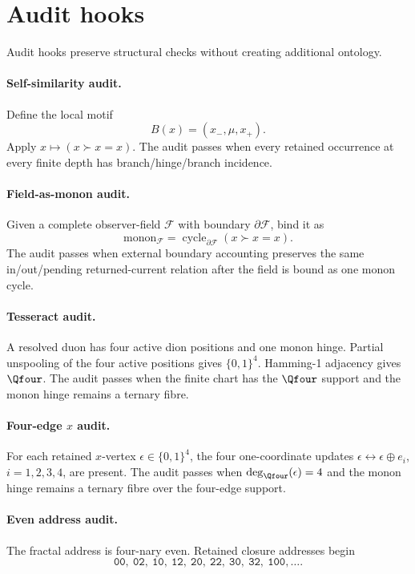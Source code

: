 \section{Audit hooks}\label{sec:audit-hooks}

Audit hooks preserve structural checks without creating additional ontology.

\paragraph{Self-similarity audit.}
Define the local motif
\[
B(x)=(x_-,\mu,x_+).
\]
Apply \(x\mapsto (x\succ x=x)\). The audit passes when every retained occurrence at every finite depth has branch/hinge/branch incidence.

\paragraph{Field-as-monon audit.}
Given a complete observer-field \(\mathcal F\) with boundary \(\partial\mathcal F\), bind it as
\[
\mathrm{monon}_{\mathcal F}=\operatorname{cycle}_{\partial\mathcal F}(x\succ x=x).
\]
The audit passes when external boundary accounting preserves the same in/out/pending returned-current relation after the field is bound as one monon cycle.

\paragraph{Tesseract audit.}
A resolved duon has four active dion positions and one monon hinge. Partial unspooling of the four active positions gives \(\{0,1\}^4\). Hamming-1 adjacency gives \(\Qfour\). The audit passes when the finite chart has the \(\Qfour\) support and the monon hinge remains a ternary fibre.


\paragraph{Four-edge \(x\) audit.}
For each retained \(x\)-vertex \(\epsilon\in\{0,1\}^4\), the four one-coordinate updates \(\epsilon\leftrightarrow\epsilon\oplus e_i\), \(i=1,2,3,4\), are present. The audit passes when \(\deg_{\Qfour}(\epsilon)=4\) and the monon hinge remains a ternary fibre over the four-edge support.

\paragraph{Even address audit.}
The fractal address is four-nary even. Retained closure addresses begin
\[
\mathtt{00},\ \mathtt{02},\ \mathtt{10},\ \mathtt{12},\ \mathtt{20},\ \mathtt{22},\ \mathtt{30},\ \mathtt{32},\ \mathtt{100},\ldots .
\]

